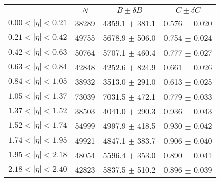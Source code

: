 \begin{tabular}{lccc}
\hline
    &   $N$   & $B \pm \delta B$  &  $C \pm \delta C$ \\
\hline
$0.00 < |\eta| <0.21$          & 38289      & 4359.1     $\pm$ 381.1 & 0.576      $\pm$ 0.020 \\
$0.21 < |\eta| <0.42$          & 49755      & 5678.9     $\pm$ 506.0 & 0.754      $\pm$ 0.024 \\
$0.42 < |\eta| <0.63$          & 50764      & 5707.1     $\pm$ 460.4 & 0.777      $\pm$ 0.027 \\
$0.63 < |\eta| <0.84$          & 42848      & 4252.6     $\pm$ 824.9 & 0.661      $\pm$ 0.026 \\
$0.84 < |\eta| <1.05$          & 38932      & 3513.0     $\pm$ 291.0 & 0.613      $\pm$ 0.025 \\
$1.05 < |\eta| <1.37$          & 73039      & 7031.5     $\pm$ 472.1 & 0.779      $\pm$ 0.033 \\
$1.37 < |\eta| <1.52$          & 38503      & 4041.0     $\pm$ 290.3 & 0.936      $\pm$ 0.043 \\
$1.52 < |\eta| <1.74$          & 54999      & 4997.9     $\pm$ 418.5 & 0.930      $\pm$ 0.042 \\
$1.74 < |\eta| <1.95$          & 49921      & 4847.1     $\pm$ 383.7 & 0.906      $\pm$ 0.040 \\
$1.95 < |\eta| <2.18$          & 48054      & 5596.4     $\pm$ 353.0 & 0.890      $\pm$ 0.041 \\
$2.18 < |\eta| <2.40$          & 42823      & 5837.5     $\pm$ 510.2 & 0.896      $\pm$ 0.039 \\
\hline
\end{tabular}
